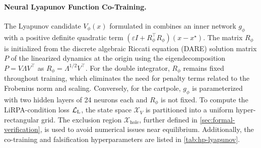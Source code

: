 \paragraph{Neural Lyapunov Function Co-Training.}
The Lyapunov candidate $V_\phi(x)$ formulated in  combines an inner network $g_\phi$ 
with a positive definite quadratic term $(\varepsilon I + R_\phi^\top R_\phi)(x - x^\star)$. 
The matrix $R_\phi$ is initialized from the discrete algebraic Riccati equation (DARE) solution matrix $P$ 
of the linearized dynamics at the origin using the eigendecomposition $P = V \Lambda V^\top$ as $R_\phi = \Lambda^{1/2} V^\top$. 
For the double integrator, $R_\phi$ remains fixed throughout training, which eliminates the need for penalty terms related 
to the Frobenius norm and scaling. 
Conversely, for the cartpole, $g_\phi$ is parameterized with two hidden layers of 24 neurons each and $R_\phi$ is not fixed. 
To compute the LiRPA-condition loss $\mathcal{L}_{\mathrm{L}}$, the state space $\mathcal{X}_V$ is partitioned into a uniform hyper-rectangular grid. 
The exclusion region $\mathcal{X}_{\mathrm{hole}}$, further defined in \cref{sec:formal-verification}, is used to avoid numerical issues near equilibrium.
Additionally, the co-training and falsification hyperparameters are listed in \cref{tab:hp-lyapunov}.

